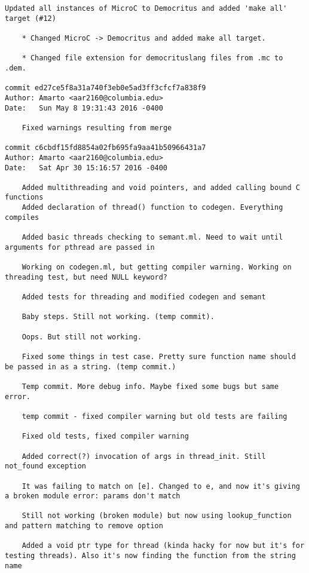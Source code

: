 \begin{lstlisting}[backgroundcolor=\color{white}]
    Updated all instances of MicroC to Democritus and added 'make all' target (#12)
    
    * Changed MicroC -> Democritus and added make all target.
    
    * Changed file extension for democrituslang files from .mc to .dem.

commit ed27ce5f8a31a740f3eb0e5ad3ff3cfcf7a838f9
Author: Amarto <aar2160@columbia.edu>
Date:   Sun May 8 19:31:43 2016 -0400

    Fixed warnings resulting from merge

commit c6cbdf15fd8854a02fb695fa9aa41b50966431a7
Author: Amarto <aar2160@columbia.edu>
Date:   Sat Apr 30 15:16:57 2016 -0400

    Added multithreading and void pointers, and added calling bound C functions
    Added declaration of thread() function to codegen. Everything compiles
    
    Added basic threads checking to semant.ml. Need to wait until arguments for pthread are passed in
    
    Working on codegen.ml, but getting compiler warning. Working on threading test, but need NULL keyword?
    
    Added tests for threading and modified codegen and semant
    
    Baby steps. Still not working. (temp commit).
    
    Oops. But still not working.
    
    Fixed some things in test case. Pretty sure function name should be passed in as a string. (temp commit.)
    
    Temp commit. More debug info. Maybe fixed some bugs but same error.
    
    temp commit - fixed compiler warning but old tests are failing
    
    Fixed old tests, fixed compiler warning
    
    Added correct(?) invocation of args in thread_init. Still not_found exception
    
    It was failing to match on [e]. Changed to e, and now it's giving a broken module error: params don't match
    
    Still not working (broken module) but now using lookup_function and pattern matching to remove option
    
    Added a void ptr type for thread (kinda hacky for now but it's for testing threads). Also it's now finding the function from the string name
    

\end{lstlisting}

